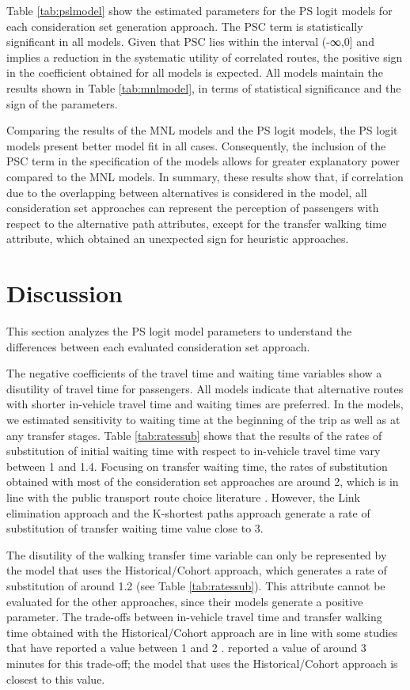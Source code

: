\documentclass[12pt,a4paper]{article}
\begin{document}
Table \ref{tab:pslmodel} show the estimated parameters for the PS logit models for each consideration set generation approach. The PSC term is statistically significant in all models. Given that PSC lies within the interval (-∞,0] and implies a reduction in the systematic utility of correlated routes, the positive sign in the coefficient obtained for all models is expected. All models maintain the results shown in Table \ref{tab:mnlmodel}, in terms of statistical significance and the sign of the parameters.

Comparing the results of the MNL models and the PS logit models, the PS logit models present better model fit in all cases. Consequently, the inclusion of the PSC term in the specification of the models allows for greater explanatory power compared to the MNL models. In summary, these results show that, if correlation due to the overlapping between alternatives is considered in the model, all consideration set approaches can represent the perception of passengers with respect to the alternative path attributes, except for the transfer walking time attribute, which obtained an unexpected sign for heuristic approaches.

\section{Discussion}

This section analyzes the PS logit model parameters to understand the differences between each evaluated consideration set approach. 

The negative coefficients of the travel time and waiting time variables show a disutility of travel time for passengers. All models indicate that alternative routes with shorter in-vehicle travel time and waiting times are preferred. In the models, we estimated sensitivity to waiting time at the beginning of the trip as well as at any transfer stages. Table \ref{tab:ratessub} shows that the results of the rates of substitution of initial waiting time with respect to in-vehicle travel time vary between 1 and 1.4. Focusing on transfer waiting time, the rates of substitution obtained with most of the consideration set approaches are around 2, which is in line with the public transport route choice literature \citep{nassir2018strategy, rui2016modeling, raveau2014analyzing}. However, the Link elimination approach and the K-shortest paths approach generate a rate of substitution of transfer waiting time value close to 3. 

The disutility of the walking transfer time variable can only be represented by the model that uses the Historical/Cohort approach, which generates a rate of substitution of around 1.2 (see Table \ref{tab:ratessub}). This attribute cannot be evaluated for the other approaches, since their models generate a positive parameter. The trade-offs between in-vehicle travel time and transfer walking time obtained with the Historical/Cohort approach are in line with some studies that have reported a value between 1 and 2 \citep{janovsikova2014estimation, nassir2018strategy}. \citep{raveau2014analyzing} reported a value of around 3 minutes for this trade-off; the model that uses the Historical/Cohort approach is closest to this value. 
\end{document}
